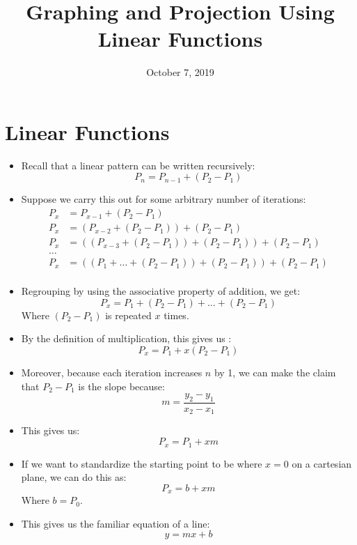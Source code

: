 \documentclass{article}
\title{Graphing and Projection Using Linear Functions}
\date{October 7, 2019}
\begin{document}
\maketitle

\section*{Linear Functions}
\begin{itemize}
    \item Recall that a linear pattern can be written recursively:
	\[
	P_n = P_{n-1} + (P_2 - P_1)
	\]

    \item Suppose we carry this out for some arbitrary number of iterations:
    \begin{align*}
    P_x &= P_{x-1} + (P_2 - P_1) \\
    P_x &= (P_{x-2} + (P_2 - P_1)) + (P_2 - P_1) \\
    P_x &= ((P_{x-3} + (P_2 - P_1)) + (P_2 - P_1)) + (P_2 - P_1) \\
    \ldots &\\
    P_x &= ((P_1 + \ldots + (P_2 - P_1)) + (P_2 - P_1)) + (P_2 - P_1) \\
    \end{align*} 

    \item Regrouping by using the associative property of addition, we get:
    \[
    P_x = P_1 + (P_2 - P_1) + \ldots + (P_2 - P_1)
    \]
    Where $(P_2 - P_1)$ is repeated $x$ times.  

    \item By the definition of multiplication, this gives us :
    \[
    P_x = P_1 + x(P_2 - P_1)
    \]

    \item Moreover, because each iteration increases $n$ by 1, we can make the
    claim that $P_2 - P_1$ is the slope because:
    \[
        m = \displaystyle\frac{y_2 - y_1} {x_2 - x_1}
    \]

    \item This gives us:
    \[
    P_x = P_1 + xm
    \]

    \item If we want to standardize the starting point to be where $x=0$ on
        a cartesian plane, we can do this as:
        \[
        P_x = b + xm
        \]
        Where $b=P_0$.
    \item This gives us the familiar equation of a line:
        \[
        \boxed{y = mx + b}
        \]


\end{itemize}
\end{document}
